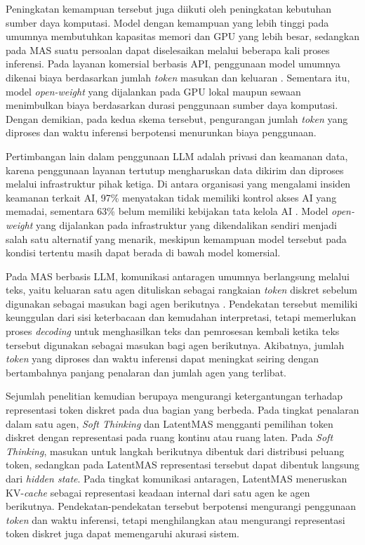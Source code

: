 Peningkatan kemampuan tersebut juga diikuti oleh peningkatan kebutuhan sumber
daya komputasi. Model dengan kemampuan yang lebih tinggi pada umumnya
membutuhkan kapasitas memori dan GPU yang lebih besar, sedangkan pada MAS
suatu persoalan dapat diselesaikan melalui beberapa kali proses inferensi.
Pada layanan komersial berbasis API, penggunaan model umumnya dikenai biaya
berdasarkan jumlah \textit{token} masukan dan keluaran \citep{openaipricing,
anthropicpricing}. Sementara itu, model \textit{open-weight} yang dijalankan
pada GPU lokal maupun sewaan menimbulkan biaya berdasarkan durasi
penggunaan sumber daya komputasi. Dengan demikian, pada kedua skema tersebut,
pengurangan jumlah \textit{token} yang diproses dan waktu inferensi berpotensi
menurunkan biaya penggunaan.

Pertimbangan lain dalam penggunaan LLM adalah privasi dan keamanan data,
karena penggunaan layanan tertutup mengharuskan data dikirim dan diproses
melalui infrastruktur pihak ketiga. Di antara organisasi yang mengalami
insiden keamanan terkait AI, 97\% menyatakan tidak memiliki kontrol akses AI
yang memadai, sementara 63\% belum memiliki kebijakan tata kelola AI
\citep{ibmbreach}. Model \textit{open-weight} yang dijalankan pada
infrastruktur yang dikendalikan sendiri menjadi salah satu alternatif yang
menarik, meskipun kemampuan model tersebut pada kondisi tertentu masih dapat
berada di bawah model komersial.

Pada MAS berbasis LLM, komunikasi antaragen umumnya berlangsung melalui teks,
yaitu keluaran satu agen dituliskan sebagai rangkaian \textit{token} diskret
sebelum digunakan sebagai masukan bagi agen berikutnya \citep{latentmas}.
Pendekatan tersebut memiliki keunggulan dari sisi keterbacaan dan kemudahan
interpretasi, tetapi memerlukan proses \textit{decoding} untuk menghasilkan
teks dan pemrosesan kembali ketika teks tersebut digunakan sebagai masukan
bagi agen berikutnya. Akibatnya, jumlah \textit{token} yang diproses dan waktu
inferensi dapat meningkat seiring dengan bertambahnya panjang penalaran dan
jumlah agen yang terlibat.

Sejumlah penelitian kemudian berupaya mengurangi ketergantungan terhadap
representasi token diskret pada dua bagian yang berbeda. Pada tingkat
penalaran dalam satu agen, \textit{Soft Thinking} \citep{softthinking} dan
LatentMAS \citep{latentmas} mengganti pemilihan token diskret dengan
representasi pada ruang kontinu atau ruang laten. Pada \textit{Soft Thinking},
masukan untuk langkah berikutnya dibentuk dari distribusi peluang token,
sedangkan pada LatentMAS representasi tersebut dapat dibentuk langsung dari
\textit{hidden state}. Pada tingkat
komunikasi antaragen, LatentMAS meneruskan KV-\textit{cache} sebagai
representasi keadaan internal dari satu agen ke agen berikutnya. Pendekatan-pendekatan tersebut berpotensi mengurangi
penggunaan \textit{token} dan waktu inferensi, tetapi menghilangkan atau
mengurangi representasi token diskret juga dapat memengaruhi akurasi sistem.

